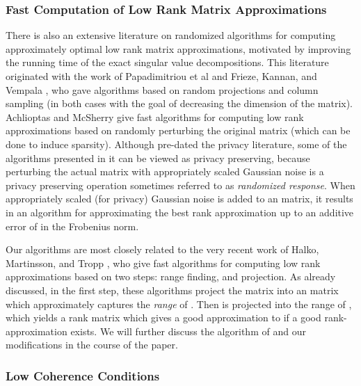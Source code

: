 \documentclass[letterpaper,11pt]{article}
\theoremstyle{definition}
\begin{document}
\subsubsection{Fast Computation of Low Rank Matrix Approximations}
There is also an extensive literature on randomized algorithms for computing
approximately optimal low rank matrix approximations, motivated by improving
the running time of the exact singular value decompositions. This literature
originated with the work of Papadimitriou et al \cite{PapadimitriouTRV98} and Frieze,
Kannan, and Vempala \cite{FriezeKV04}, who gave algorithms based on random
projections and column sampling (in both cases with the goal of decreasing the
dimension of the matrix). Achlioptas and McSherry \cite{AchlioptasM01} give fast
algorithms for computing low rank approximations based on randomly perturbing
the original matrix (which can be done to induce sparsity). Although
\cite{AchlioptasM01} pre-dated the privacy literature, some of the algorithms presented
in it can be viewed as privacy preserving, because perturbing the actual
matrix with appropriately scaled Gaussian noise is a privacy preserving
operation sometimes referred to as \emph{randomized response}. When
appropriately scaled (for privacy) Gaussian noise is added to an 
matrix, it results in an algorithm for approximating the best rank 
approximation up to an additive error of  in the Frobenius
norm.


Our algorithms are most closely related to  the very recent work of Halko,
Martinsson, and Tropp \cite{HalkoMT11}, who give fast algorithms for computing
low rank approximations based on two steps: range finding, and projection. As
already discussed, in the first step, these algorithms project the matrix 
into an  matrix  which approximately captures the \emph{range}
of . Then  is projected into the range of , which yields a rank 
matrix which gives a good approximation to  if a good rank-
approximation exists. We will further discuss the algorithm of
\cite{HalkoMT11} and our modifications in the course of the paper.



\subsubsection{Low Coherence Conditions}
\end{document}
